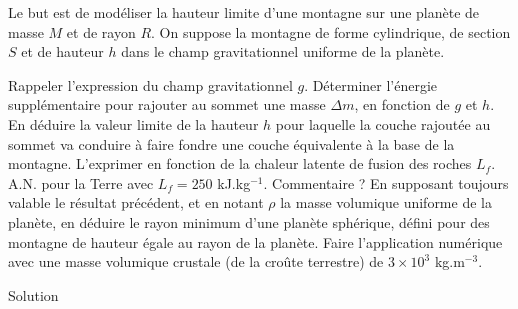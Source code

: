 \begin{Exercise}[title=Taille maximale d'une montage]
  Le but est de modéliser la hauteur limite d'une montagne sur une planète de masse $M$ et de rayon $R$. On suppose la montagne de forme cylindrique, de section $S$ et de hauteur $h$ dans le champ gravitationnel uniforme de la planète.


  \Question Rappeler l'expression du champ gravitationnel $g$. Déterminer l'énergie supplémentaire pour rajouter au sommet une masse $\Delta m$, en fonction de $g$ et $h$.
  \Question En déduire la valeur limite de la hauteur $h$ pour laquelle la couche rajoutée au sommet va conduire à faire fondre une couche équivalente à la base de la montagne. L'exprimer en fonction de la chaleur latente de fusion des roches $L_f$. A.N. pour la Terre avec $L_f = 250$ kJ.kg$^{-1}$. Commentaire ?
  \Question En supposant toujours valable le résultat précédent, et en notant $\rho$ la masse volumique uniforme de la planète, en déduire le rayon minimum d'une planète sphérique, défini pour des montagne de hauteur égale au rayon de la planète. Faire l'application numérique avec une masse volumique crustale (de la croûte terrestre) de $3 \times 10^3$ kg.m$^{-3}$.

\end{Exercise}
\begin{Answer}
  Solution
\end{Answer}
